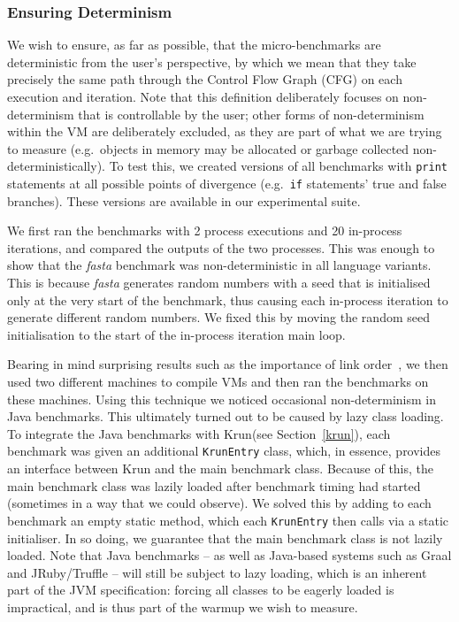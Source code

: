 \documentclass[preprint,numbers,10pt]{sigplanconf}
\newcommand{\krun}{Krun\xspace}
\newcommand{\fasta}{\emph{fasta}\xspace}
\begin{document}
\subsubsection{Ensuring Determinism}

We wish to ensure, as far as possible, that the micro-benchmarks are
deterministic from the user's perspective, by which we mean that they
take precisely the same path through the Control Flow Graph (CFG) on each
execution and iteration. Note that this definition deliberately focuses
on non-determinism that is controllable by the user; other forms of
non-determinism within the VM are deliberately excluded, as they are
part of what we are trying to measure (e.g.~objects in memory may be allocated
or garbage collected non-deterministically). To test this, we created
versions of all benchmarks with \texttt{print} statements at all possible points of
divergence (e.g.~\texttt{if} statements' true and false branches).
These versions are available in our experimental suite.

We first ran the benchmarks with 2 process executions and 20 in-process iterations,
and compared the outputs of the two processes. This was enough to show that the
\fasta benchmark was non-deterministic
in all language variants. This is because \fasta generates random numbers with
a seed that is initialised only at the very start of the benchmark, thus
causing each in-process iteration to generate different random numbers. We
fixed this by moving the random seed initialisation to the start
of the in-process iteration main loop.

Bearing in mind surprising
results such as the importance of link order~\cite{mytkowicz09surprising}, we
then used two different machines to compile VMs and then ran the benchmarks
on these machines.
Using this technique we noticed occasional non-determinism in Java benchmarks.
This ultimately turned out to be caused by lazy class loading. To integrate
the Java benchmarks with \krun (see Section~\ref{krun}), each
benchmark was given an additional \texttt{KrunEntry} class,
which, in essence, provides an interface between \krun and the main benchmark
class. Because of this, the main benchmark class was lazily loaded after
benchmark timing had started (sometimes in a way that we could observe). We
solved this by adding to each benchmark an empty static method, which each
\texttt{KrunEntry} then calls via a static initialiser. In so doing, we
guarantee that the main benchmark class is not lazily loaded. Note that Java
benchmarks -- as well as
Java-based systems such as Graal and JRuby/Truffle -- will still be subject to
lazy loading, which is an inherent part of the JVM specification: forcing all
classes to be eagerly loaded is impractical, and is thus part of the warmup we
wish to measure.
\end{document}

